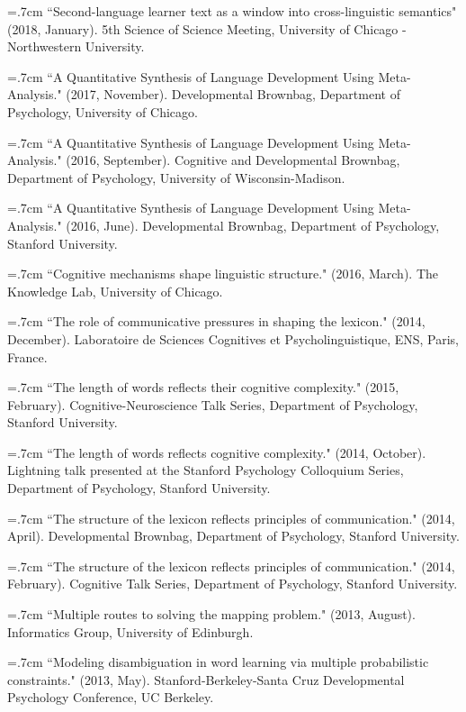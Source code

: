 \documentclass[letterpaper]{article}
\begin{document}
\hangindent=.7cm ``Second-language learner text as a window into cross-linguistic semantics" (2018, January). 5th Science of Science Meeting,  University of Chicago - Northwestern University.

\hangindent=.7cm ``A Quantitative Synthesis of Language Development Using Meta-Analysis." (2017, November). Developmental Brownbag, Department of Psychology,  University of Chicago.

\hangindent=.7cm ``A Quantitative Synthesis of Language Development Using Meta-Analysis." (2016, September). Cognitive and Developmental Brownbag, Department of Psychology,  University of Wisconsin-Madison.

\hangindent=.7cm ``A Quantitative Synthesis of Language Development Using Meta-Analysis." (2016, June). Developmental Brownbag, Department of Psychology,  Stanford University.

\hangindent=.7cm  ``Cognitive mechanisms shape linguistic structure."  (2016, March). The Knowledge Lab, University of Chicago.

\hangindent=.7cm ``The role of communicative pressures in shaping the lexicon." (2014, December). Laboratoire de Sciences Cognitives et Psycholinguistique, ENS, Paris, France.

\hangindent=.7cm ``The length of words reflects their cognitive complexity." (2015, February). Cognitive-Neuroscience Talk Series, Department of Psychology, Stanford University.

\hangindent=.7cm ``The length of words reflects cognitive complexity." (2014, October). Lightning talk presented at the Stanford Psychology Colloquium Series, Department of Psychology, Stanford University.


\hangindent=.7cm ``The structure of the lexicon reflects principles of communication." (2014, April). Developmental Brownbag, Department of Psychology, Stanford University.

\hangindent=.7cm ``The structure of the lexicon reflects principles of communication." (2014, February). Cognitive Talk Series, Department of Psychology, Stanford University.

\hangindent=.7cm ``Multiple routes to solving the mapping problem." (2013, August). Informatics Group, University of Edinburgh.
 
\hangindent=.7cm ``Modeling disambiguation in word learning via multiple probabilistic constraints." (2013, May). Stanford-Berkeley-Santa Cruz Developmental Psychology Conference, UC Berkeley.
\end{document}
